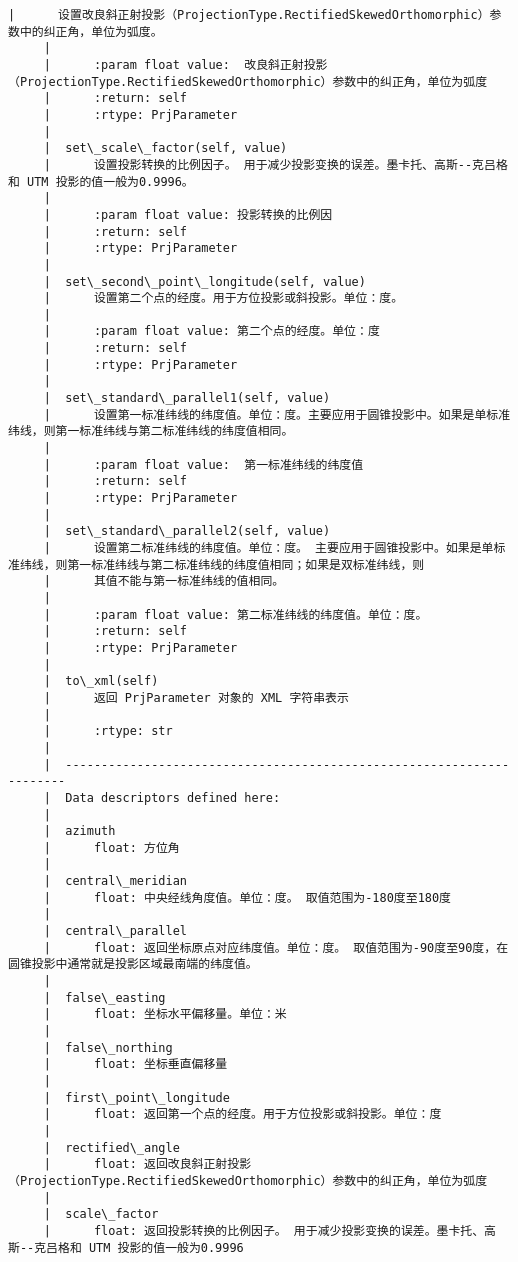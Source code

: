 \documentclass[11pt]{article}
\begin{document}
\begin{Verbatim}[commandchars=\\\{\}]
     |      设置改良斜正射投影（ProjectionType.RectifiedSkewedOrthomorphic）参数中的纠正角，单位为弧度。
     |      
     |      :param float value:  改良斜正射投影（ProjectionType.RectifiedSkewedOrthomorphic）参数中的纠正角，单位为弧度
     |      :return: self
     |      :rtype: PrjParameter
     |  
     |  set\_scale\_factor(self, value)
     |      设置投影转换的比例因子。 用于减少投影变换的误差。墨卡托、高斯--克吕格和 UTM 投影的值一般为0.9996。
     |      
     |      :param float value: 投影转换的比例因
     |      :return: self
     |      :rtype: PrjParameter
     |  
     |  set\_second\_point\_longitude(self, value)
     |      设置第二个点的经度。用于方位投影或斜投影。单位：度。
     |      
     |      :param float value: 第二个点的经度。单位：度
     |      :return: self
     |      :rtype: PrjParameter
     |  
     |  set\_standard\_parallel1(self, value)
     |      设置第一标准纬线的纬度值。单位：度。主要应用于圆锥投影中。如果是单标准纬线，则第一标准纬线与第二标准纬线的纬度值相同。
     |      
     |      :param float value:  第一标准纬线的纬度值
     |      :return: self
     |      :rtype: PrjParameter
     |  
     |  set\_standard\_parallel2(self, value)
     |      设置第二标准纬线的纬度值。单位：度。 主要应用于圆锥投影中。如果是单标准纬线，则第一标准纬线与第二标准纬线的纬度值相同；如果是双标准纬线，则
     |      其值不能与第一标准纬线的值相同。
     |      
     |      :param float value: 第二标准纬线的纬度值。单位：度。
     |      :return: self
     |      :rtype: PrjParameter
     |  
     |  to\_xml(self)
     |      返回 PrjParameter 对象的 XML 字符串表示
     |      
     |      :rtype: str
     |  
     |  ----------------------------------------------------------------------
     |  Data descriptors defined here:
     |  
     |  azimuth
     |      float: 方位角
     |  
     |  central\_meridian
     |      float: 中央经线角度值。单位：度。 取值范围为-180度至180度
     |  
     |  central\_parallel
     |      float: 返回坐标原点对应纬度值。单位：度。 取值范围为-90度至90度，在圆锥投影中通常就是投影区域最南端的纬度值。
     |  
     |  false\_easting
     |      float: 坐标水平偏移量。单位：米
     |  
     |  false\_northing
     |      float: 坐标垂直偏移量
     |  
     |  first\_point\_longitude
     |      float: 返回第一个点的经度。用于方位投影或斜投影。单位：度
     |  
     |  rectified\_angle
     |      float: 返回改良斜正射投影（ProjectionType.RectifiedSkewedOrthomorphic）参数中的纠正角，单位为弧度
     |  
     |  scale\_factor
     |      float: 返回投影转换的比例因子。 用于减少投影变换的误差。墨卡托、高斯--克吕格和 UTM 投影的值一般为0.9996

\end{Verbatim}
\end{document}
